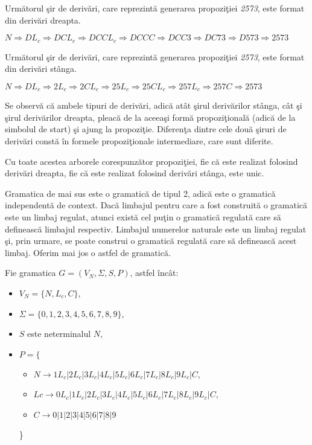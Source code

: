 Următorul şir de derivări, care reprezintă generarea propoziţiei \textit{2573}, este format din derivări dreapta.

$ N \Rightarrow D L_c \Rightarrow DCL_c \Rightarrow DCCL_c \Rightarrow DCCC  \Rightarrow DCC3 \Rightarrow DC73 \Rightarrow D573 \Rightarrow 2573 $

Următorul şir de derivări, care reprezintă generarea propoziţiei \textit{2573}, este format din derivări stânga.

$ N \Rightarrow D L_c \Rightarrow 2L_c \Rightarrow2CL_c \Rightarrow 25L_c \Rightarrow 25CL_c \Rightarrow 257L_c \Rightarrow 257C \Rightarrow 2573$

Se observă că ambele tipuri de derivări, adică atât şirul derivărilor stânga, cât şi şirul derivărilor dreapta, pleacă de la aceeaşi formă propoziţională (adică de la simbolul de start) şi ajung la propoziţie. Diferenţa dintre cele două şiruri de derivări constă în formele propoziţionale intermediare, care sunt diferite.

Cu toate acestea arborele corespunzător propoziţiei, fie că este realizat folosind derivări dreapta, fie că este realizat folosind derivări stânga, este unic.

Gramatica de mai sus este o gramatică de tipul 2, adică este o gramatică independentă de context. Dacă limbajul pentru care a fost construită o gramatică este un limbaj regulat, atunci există cel puţin o gramatică regulată care să definească limbajul respectiv. Limbajul numerelor naturale este un limbaj regulat şi, prin urmare, se poate construi o gramatică regulată care să definească acest limbaj. Oferim mai jos o astfel de gramatică.

Fie gramatica $G = (V_{N}, \Sigma, S, P)$, astfel încât:

\begin{itemize}
\item
$V_{N} = \{N,L_c,C\}$,
\item
$\Sigma = \{0,1,2,3,4,5,6,7,8,9\}$,
\item
$S$ este neterminalul $N$, 
\item
$P = \{$
\begin{itemize}
\item
$N \rightarrow 1 L_c | 2 L_c | 3 L_c | 4 L_c | 5 L_c | 6 L_c | 7 L_c| 8 L_c | 9 L_c| C $,
\item
$Lc \rightarrow 0 L_c | 1 L_c | 2 L_c | 3 L_c | 4 L_c | 5 L_c | 6 L_c | 7 L_c| 8 L_c | 9 L_c | C$,
\item
$C \rightarrow 0|1|2|3|4|5|6|7|8|9$
\end{itemize}
\}
\end{itemize}

